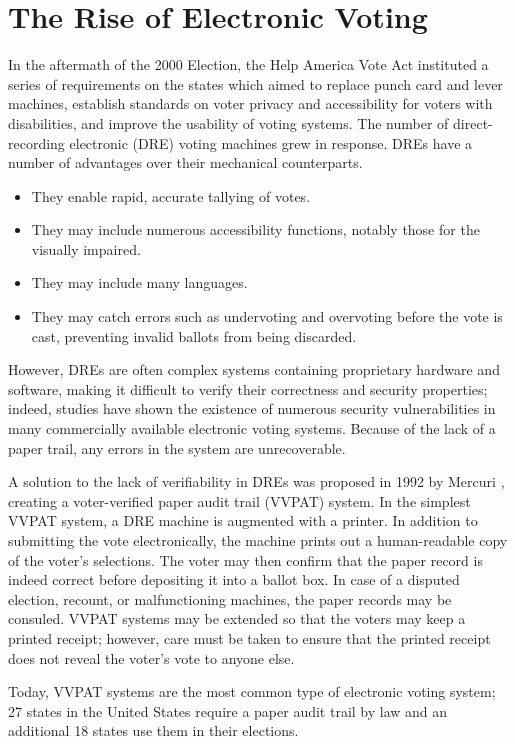 \section{The Rise of Electronic Voting} \label{intro:evoting}

In the aftermath of the 2000 Election, the Help America Vote Act instituted a series of requirements on the states which aimed to replace punch card and lever machines, establish standards on voter privacy and accessibility for voters with disabilities, and improve the usability of voting systems. The number of direct-recording electronic (DRE) voting machines grew in response. DREs have a number of advantages over their mechanical counterparts.
\begin{itemize}
\item They enable rapid, accurate tallying of votes.
\item They may include numerous accessibility functions, notably those for the visually impaired.
\item They may include many languages.
\item They may catch errors such as undervoting and overvoting before the vote is cast, preventing invalid ballots from being discarded.
\end{itemize}

However, DREs are often complex systems containing proprietary hardware and software, making it difficult to verify their correctness and security properties; indeed, studies have shown the existence of numerous security vulnerabilities in many commercially available electronic voting systems. Because of the lack of a paper trail, any errors in the system are unrecoverable.

A solution to the lack of verifiability in DREs was proposed in 1992 by Mercuri \cite{mercuri:vvpat}, creating a voter-verified paper audit trail (VVPAT) system. In the simplest VVPAT system, a DRE machine is augmented with a printer. In addition to submitting the vote electronically, the machine prints out a human-readable copy of the voter's selections. The voter may then confirm that the paper record is indeed correct before depositing it into a ballot box. In case of a disputed election, recount, or malfunctioning machines, the paper records may be consuled. VVPAT systems may be extended so that the voters may keep a printed receipt; however, care must be taken to ensure that the printed receipt does not reveal the voter's vote to anyone else.

Today, VVPAT systems are the most common type of electronic voting system; 27 states in the United States require a paper audit trail by law and an additional 18 states use them in their elections.

